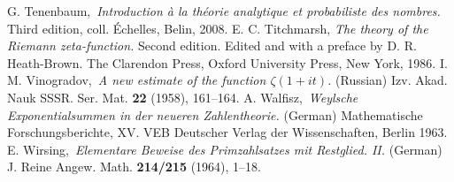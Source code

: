 \documentclass[12pt]{amsart}
\theoremstyle{remark}
\numberwithin{equation}{section}
\begin{document}
\begin{thebibliography}{99}
 G. Tenenbaum,\,
{\sl Introduction \`a la th\'eorie analytique et probabiliste des nombres.} Third edition, coll. \'Echelles, Belin, 2008.
 E. C. Titchmarsh,
{\sl The theory of the Riemann zeta-function.} Second edition. Edited and with a preface by D. R. Heath-Brown. The Clarendon Press, Oxford University Press, New York, 1986.
 I. M. Vinogradov,\,
{\sl A new estimate of the function $\zeta(1+it)$.} (Russian) Izv. Akad. Nauk SSSR. Ser. Mat. {\bf 22} (1958), 161--164.
 A. Walfisz,\,
{\sl Weylsche Exponentialsummen in der neueren Zahlentheorie.} (German) Mathematische Forschungsberichte, XV. VEB Deutscher Verlag der Wissenschaften, Berlin 1963.
 E. Wirsing,\,
{\sl Elementare Beweise des Primzahlsatzes mit Restglied. II.} (German) J. Reine Angew. Math. {\bf 214/215} (1964), 1--18.
\end{thebibliography}
\end{document}
